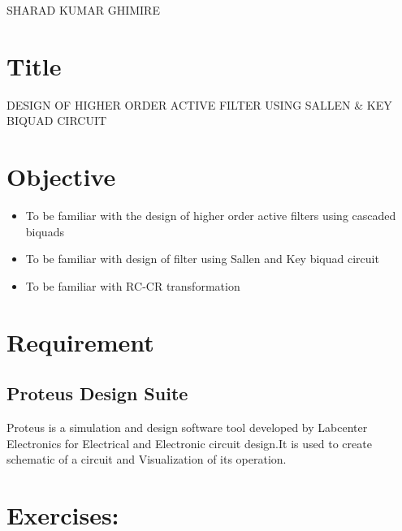 \documentclass[a4paper,11pt]{article}
\begin{document}
{SHARAD KUMAR GHIMIRE}

\renewcommand{\contentsname}{Table of Contents}
\tableofcontents
\vspace{5em}
\listoffigures
\vspace{5em}
\listoftables


\pagebreak
{}

\section{Title} {\large DESIGN OF HIGHER ORDER ACTIVE   FILTER USING
  SALLEN \& KEY  BIQUAD CIRCUIT}


\section{Objective}
\begin{itemize}
    \item To be familiar with the design of higher order active filters using cascaded biquads
    \item  To be familiar with design of filter using Sallen and Key biquad circuit
    \item  To be familiar with RC-CR transformation
\end{itemize}

\section{Requirement}

\subsection{Proteus Design Suite}

Proteus is a simulation and design software tool developed by Labcenter Electronics for Electrical
and Electronic circuit design.It is used to create schematic  of a circuit and
Visualization of its operation.

\pagebreak


\section{Exercises:}
\end{document}
